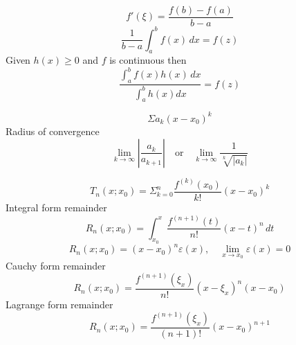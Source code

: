 \documentclass[10pt,landscape,a4paper]{article}
\newenvironment{topic}[1]
{\begin{mdframed}[
    linecolor=black,
    frametitle=#1,
    frametitlebackgroundcolor=black!5,
  ]}
{\end{mdframed}}
\newcommand{\dx}[1][x]{\,d#1}
\newcommand{\abint}{\int_a^b}
\newcommand{\inftylim}[1]{\lim_{#1 \rightarrow \infty}}
\begin{document}
\begin{multicols}{3}
  \begin{topic}{Intermediate value}{
      \[
        f'(\xi) = \frac{f(b) - f(a)}{b - a}
      \]
      \[
        \frac{1}{b - a} \abint f(x) \dx = f(z)
      \]
      Given $h(x) \geq 0$ and $f$ is continuous then
      \[
        \frac{\abint f(x)h(x) \dx}{ \abint h(x) dx}
        = f(z)
      \]
  }\end{topic}

  \begin{topic}{Power series}{
      \[
        \Sigma a_k (x - x_0)^k
      \]
      Radius of convergence
      \[
        \inftylim{k} \left| \frac{a_k}{a_{k+1}} \right|
        \quad\text{or}\quad
        \inftylim{k} \frac{1}{\sqrt[k]{|a_k|}}
      \]
  }\end{topic}

  \begin{topic}{Taylor's theorem}{
      \[
        T_n(x; x_0) = \Sigma_{k=0}^n \frac{f^{(k)}(x_0)}{k!} (x-x_0)^k
      \]
      Integral form remainder
      \[
        R_n(x; x_0)
        = \int_{x_0}^x \frac{f^{(n+1)}(t)}{n!} (x-t)^n \dx[t]
      \]
      \[
        R_n(x; x_0) = (x - x_0)^n \varepsilon(x),
        \quad \lim_{x \rightarrow x_0} \varepsilon(x) = 0
      \]
      Cauchy form remainder
      \[
        R_n(x; x_0)
        = \frac{ f^{(n+1)}(\xi_x) }{n!} (x - \xi_x)^n (x - x_0)
      \]
      Lagrange form remainder
      \[
        R_n(x; x_0)
        = \frac{ f^{(n+1)}(\xi_x) }{ (n + 1)! } (x - x_0)^{n+1}
      \]
  }\end{topic}

\end{multicols}
\end{document}
